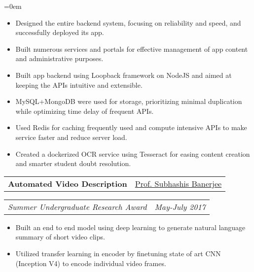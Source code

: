 \documentclass{article}
\makeatletter
\newcommand{\headerrow}[2]
{\begin{tabular*}{\linewidth}{l@{\extracolsep{\fill}}r}
	#1 &
	#2 \\
\end{tabular*}}
\makeatother
\begin{document}
\begin{list} {}{\leftmargin=0em}
\begin{itemize}
    \setlength\itemsep{0.0em}
    \item Designed the entire backend system, focusing on reliability and speed, and successfully deployed its app.
    \item Built numerous services and portals for effective management of app content and administrative purposes.
	\item Built app backend using Loopback framework on NodeJS and aimed at keeping the APIs intuitive and extensible.
	\item MySQL+MongoDB were used for storage, prioritizing minimal duplication while optimizing time delay of frequent APIs.
	\item Used Redis for caching frequently used and compute intensive APIs to make service faster and reduce server load.
    \item Created a dockerized OCR service using Tesseract for easing content creation and smarter student doubt resolution.
    \end{itemize}
    \item[]
    \headerrow {\textbf{Automated Video Description}}{\underline{Prof. Subhashis Banerjee}}
    \headerrow {\emph{Summer Undergraduate Research Award}}{\emph{May-July 2017}}
    \begin{itemize}
    \setlength\itemsep{0.0em}
        \item Built an end to end model using deep learning to generate natural language summary of short video clips.
        \item Utilized transfer learning in encoder by finetuning state of art CNN (Inception V4) to encode individual video frames.

\end{itemize}
\end{list}
\end{document}
